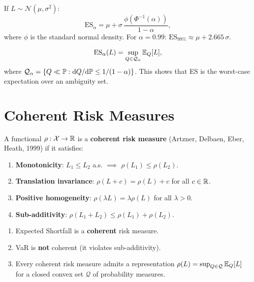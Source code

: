 \begin{example}[Gaussian ES]
If $L \sim \mathcal{N}(\mu, \sigma^2)$:
\[
    \mathrm{ES}_\alpha = \mu + \sigma\,\frac{\phi(\Phi^{-1}(\alpha))}{1 - \alpha},
\]
where $\phi$ is the standard normal density. For $\alpha = 0.99$:
$\mathrm{ES}_{99\%} \approx \mu + 2.665\,\sigma$.
\end{example}

\begin{theorem}
\[
    \mathrm{ES}_\alpha(L) = \sup_{Q \in \mathcal{Q}_\alpha} \mathbb{E}_Q[L],
\]
where $\mathcal{Q}_\alpha = \{Q \ll \mathbb{P} : \mathrm{d}Q/\mathrm{d}\mathbb{P} \leq
1/(1-\alpha)\}$. This shows that ES is the worst-case expectation over an
ambiguity set.
\end{theorem}

\section{Coherent Risk Measures}

\begin{definition}
A functional $\rho : \mathcal{X} \to \mathbb{R}$ is a \textbf{coherent risk measure}
(Artzner, Delbaen, Eber, Heath, 1999) if it satisfies:
\begin{enumerate}
    \item \textbf{Monotonicity}: $L_1 \leq L_2$ a.s. $\implies$
    $\rho(L_1) \leq \rho(L_2)$.
    \item \textbf{Translation invariance}: $\rho(L + c) = \rho(L) + c$ for
    all $c \in \mathbb{R}$.
    \item \textbf{Positive homogeneity}: $\rho(\lambda L) = \lambda\rho(L)$
    for all $\lambda > 0$.
    \item \textbf{Sub-additivity}: $\rho(L_1 + L_2) \leq \rho(L_1) + \rho(L_2)$.
\end{enumerate}
\end{definition}

\begin{theorem}[ADEH, 1999]
\begin{enumerate}
    \item Expected Shortfall is a \textbf{coherent} risk measure.
    \item VaR is \textbf{not} coherent (it violates sub-additivity).
    \item Every coherent risk measure admits a representation
    $\rho(L) = \sup_{Q \in \mathcal{Q}} \mathbb{E}_Q[L]$ for a closed convex set
    $\mathcal{Q}$ of probability measures.
\end{enumerate}
\end{theorem}

